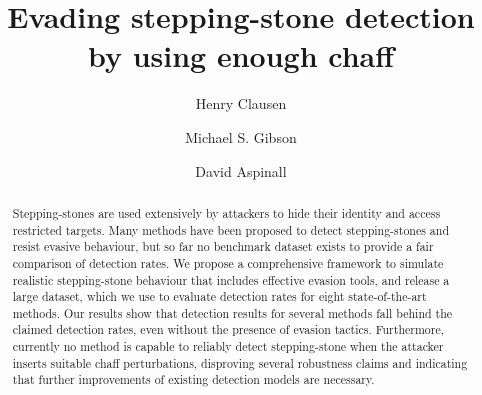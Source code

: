 \documentclass[runningheads,11pt]{llncs}\usepackage[]{graphicx}\usepackage[]{color}
\begin{document}
\title{Evading stepping-stone detection by using enough chaff}



\author{Henry Clausen \and
Michael S. Gibson \and
David Aspinall}
%
%







\maketitle     

\vspace{-0.3cm}
\begin{abstract}

Stepping-stones are used extensively by attackers to hide their identity and access restricted targets. Many methods have been proposed to detect stepping-stones and resist evasive behaviour, but so far no benchmark dataset exists to provide a fair comparison of detection rates. We propose a comprehensive framework to simulate realistic stepping-stone behaviour that includes effective evasion tools, and release a large dataset, which we use to evaluate detection rates for eight state-of-the-art methods.
Our results show that detection results for several methods fall behind the claimed detection rates, even without the presence of evasion tactics. Furthermore, currently no method is capable to reliably detect stepping-stone when the attacker inserts suitable chaff perturbations, disproving several robustness claims and indicating that further improvements of existing detection models are necessary.

\end{abstract}
\end{document}
